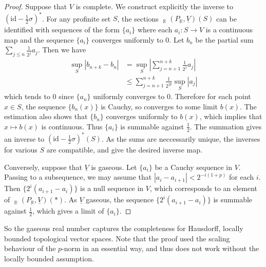 \documentclass{article}
\theoremstyle{plain}
\theoremstyle{definition}
\theoremstyle{remark}
\DeclareMathOperator{\Homs}{\underline{Hom}}
\begin{document}
\begin{proof}
Suppose that $ V $ is complete. We construct explicitly the inverse to $ (\mathrm{id} - \frac{1}{2}\sigma)^{*} $.
For any profinite set $ S $, the sections $ \Homs _{\mathbb{R}}(P _{\mathbb{R}}, \underline{V})(S) $
can be identified with sequences of the form $ \{a _{i}\} $ where each $ a _{i}: S\to V $ is a continuous map
and the sequence $ \{a _{i}\} $ converges uniformly to $ 0 $.
Let $ b _{n} $ be the partial sum $ \sum _{j\leq n} \frac{1}{2 ^{j}} a _{j} $.
Then we have
\begin{align*}
\sup _{S}|b _{n+k} - b _{n}|
&= \sup _{S}|\sum _{j=n+1}^{n+k} \frac{1}{2 ^{j}}a _{j}|\\
&\leq \sum _{j=n+1}^{n+k} \frac{1}{2 ^{jp}} \sup _{S}|a _{j}|
\end{align*}
which tends to $ 0 $ since $ \{a _{n}\} $ uniformly converges to $ 0 $.
Therefore for each point $ x\in S $, the sequence $ \{b _{n}(x)\} $ is Cauchy, so converges to some limit $ b (x) $.
The estimation also shows that $ \{b _{n}\} $ converges uniformly to $ b (x) $,
which implies that $ x\mapsto b (x) $ is continuous.
Thus $ \{a _{i}\} $ is summable against $ \frac{1}{2} $.
The summation gives an inverse to $ (\mathrm{id}-\frac{1}{2}\sigma)^{*}(S) $.
As the sums are neccessarily unique, the inverses for various $ S $ are compatible,
and give the desired inverse map.

Conversely, suppose that $ \underline{V} $ is gaseous.
Let $ \{a _{i}\} $ be a Cauchy sequence in $ V $.
Passing to a subsequence, we may assume that $ |a _{i} - a _{i+1}| < 2 ^{-i(1+p)} $ for each $ i $.
Then $ \{2 ^{i}(a _{i+1}- a _{i})\} $ is a null sequence in $ V $, which corresponds to an element of
$ \Homs _{\mathbb{R}}(P _{\mathbb{R}}, \underline{V})(*) $.
As $ \underline{V} $ gaseous, the sequence $ \{2 ^{i}(a _{i+1}-a _{i})\} $ is summable against $ \frac{1}{2} $,
which gives a limit of $ \{a _{i}\} $.
\end{proof}

So the gaseous real number captures the completeness for Hausdorff, locally bounded topological vector spaces.
Note that the proof used the scaling behaviour of the $ p $-norm in an essential way,
and thus does not work without the locally bounded assumption.
%

\printbibliography
\end{document}
